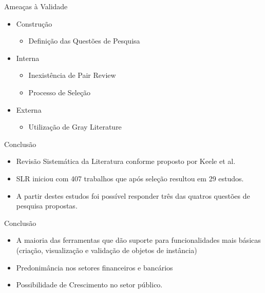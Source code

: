 \documentclass[t,14pt,mathserif]{beamer}
\begin{document}
\begin{frame}{Ameaças à Validade}
    \begin{itemize}
      \item Construção
        \begin{itemize}
        \item Definição das Questões de Pesquisa
        \end{itemize}
      \item Interna
        \begin{itemize}
        \item Inexistência de Pair Review
        \item Processo de Seleção
        \end{itemize}
      \item Externa
      \begin{itemize}
        \item Utilização de Gray Literature
        \end{itemize}
    \end{itemize}
\end{frame}
\begin{frame}{Conclusão}
    \begin{itemize}
\item Revisão Sistemática da Literatura conforme proposto por Keele et al. \cite{keele2007guidelines}
\item SLR iniciou com 407 trabalhos que após seleção resultou em 29 estudos.
\item A partir destes estudos foi possível responder três das quatros questões de pesquisa propostas.

    \end{itemize}
\end{frame}
\begin{frame}{Conclusão}
    \begin{itemize}
\item A maioria das ferramentas que dão suporte para funcionalidades mais
  básicas (criação, visualização e validação de objetos  de instância)
\item Predonimância nos setores financeiros e bancários
\item Possibilidade de Crescimento no setor público.
    \end{itemize}
\end{frame}
\end{document}
